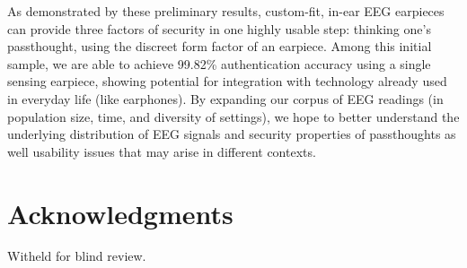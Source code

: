 \documentclass{sigchi}
\begin{document}
As demonstrated by these preliminary results, custom-fit, in-ear EEG earpieces can provide three factors of security in one highly usable step: thinking one's passthought, using the discreet form factor of an earpiece. Among this initial sample, we are able to achieve 99.82\% authentication accuracy using a single sensing earpiece, showing potential for integration with technology already used in everyday life (like earphones). By expanding our corpus of EEG readings (in population size, time, and diversity of settings), we hope to better understand the underlying distribution of EEG signals and security properties of passthoughts as well usability issues that may arise in different contexts.

\section{Acknowledgments}
Witheld for blind review.


%
%
%
%




\end{document}
